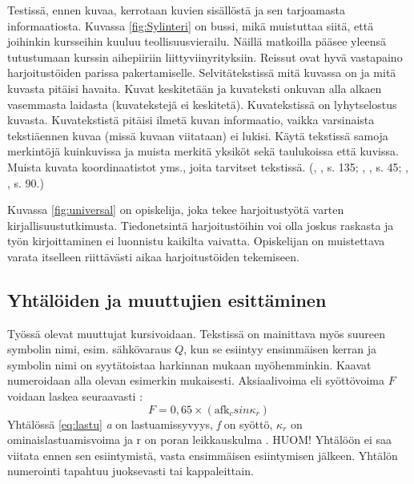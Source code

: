 \documentclass{LUT_pohja}[2016/03/09 LUT Dippa Pohja]
\begin{document}
Testissä, ennen kuvaa, kerrotaan kuvien sisällöstä ja sen tarjoamasta informaatiosta.
Kuvassa \ref{fig:Sylinteri} on bussi, mikä muistuttaa siitä, että joihinkin kursseihin kuuluu teollisuusvierailu. Näillä matkoilla pääsee yleensä tutustumaan kurssin aihepiiriin liittyviinyrityksiin. Reissut ovat hyvä vastapaino harjoitustöiden parissa pakertamiselle. Selvitätekstissä mitä kuvassa on ja mitä kuvasta pitäisi havaita. Kuvat keskitetään ja kuvateksti onkuvan alla alkaen vasemmasta laidasta (kuvatekstejä ei keskitetä). Kuvatekstissä on lyhytselostus kuvasta. Kuvatekstistä pitäisi ilmetä kuvan informaatio, vaikka varsinaista tekstiäennen kuvaa (missä kuvaan viitataan) ei lukisi. Käytä tekstissä samoja merkintöjä kuinkuvissa ja muista merkitä yksiköt sekä taulukoissa että kuvissa. Muista kuvata koordinaatistot yms., joita tarvitset tekstissä. (\citeauthor{Andersson97}, \citeyear{Andersson97}, s. 135; \citeauthor{Jantunen07}, \citeyear{Jantunen07}, s. 45; \citeauthor{Leino00}, \citeyear{Leino00}, s. 90.)\\

Kuvassa \ref{fig:universal} on opiskelija, joka tekee harjoitustyötä varten kirjallisuustutkimusta. Tiedonetsintä harjoitustöihin voi olla joskus raskasta ja työn kirjoittaminen ei luonnistu kaikilta vaivatta. Opiskelijan on muistettava varata itselleen riittävästi aikaa harjoitustöiden
tekemiseen. \citep[s. 34.]{Varis97}
%

\subsection{Yhtälöiden ja muuttujien esittäminen}
Työssä olevat muuttujat kursivoidaan. Tekstissä on mainittava myös suureen symbolin
nimi, esim. sähkövaraus $Q$, kun se esiintyy ensimmäisen kerran ja symbolin nimi on syytätoistaa harkinnan mukaan myöhemminkin. Kaavat numeroidaan alla olevan esimerkin
mukaisesti. Aksiaalivoima eli syöttövoima $F$ voidaan laskea seuraavasti \citep[s. 91]{Leino00}:
\begin{equation}\label{eq:lastu}
F = 0,65\times (\mathrm{afk}_{c} sin \kappa_{r})
\end{equation}
Yhtälössä \ref{eq:lastu} \textit{a} on lastuamissyvyys, \textit{f} on syöttö, \textit{$\kappa_{r}$} on ominaislastuamisvoima ja r on poran leikkauskulma \citep[s. 91]{Leino00}. HUOM! Yhtälöön ei saa viitata ennen sen esiintymistä, vasta ensimmäisen esiintymisen jälkeen. Yhtälön numerointi tapahtuu juoksevasti tai kappaleittain.
\end{document}
